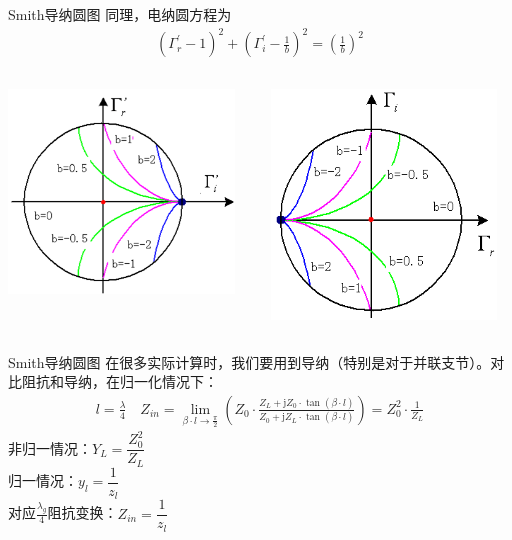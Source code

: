 \begin{frame}{Smith导纳圆图}
  同理，电纳圆方程为
  \begin{align*}
    (\Gamma_r^{'}-1)^2+\left(\Gamma_i^{'}-\frac{1}{b}\right)^2=\left(\frac{1}{b}\right)^2
  \end{align*}
  \begin{columns}
    \begin{column}{0.5\linewidth}
      \includegraphics[width=6cm]{equal_B_circle1.png}
    \end{column}
    \begin{column}{0.5\linewidth}
      \includegraphics[width=6cm]{equal_B_circle2.png}
    \end{column}
  \end{columns}

\end{frame}

\begin{frame}{Smith导纳圆图}
  在很多实际计算时，我们要用到导纳（特别是对于并联支节）。对比阻抗和导纳，在归一化情况下：
  \begin{align*}
    l=\frac{\lambda}{4} \quad Z_{in}=\lim_{\beta\cdot l\to \frac{\pi}{2}}\left(Z_0\cdot\frac{Z_L+\mathrm{j}Z_0\cdot\tan(\beta\cdot l)}{Z_0+\mathrm{j}Z_L\cdot\tan(\beta\cdot l)}\right)=Z_0^2\cdot\frac{1}{Z_L}
  \end{align*}
  非归一情况：$Y_L=\dfrac{Z_0^2}{Z_L}$ \\
  归一情况：$y_l=\dfrac{1}{z_l}$\\
  对应$\frac{\lambda_g}{4}$阻抗变换：$Z_{in}=\dfrac{1}{z_l}$
\end{frame}

